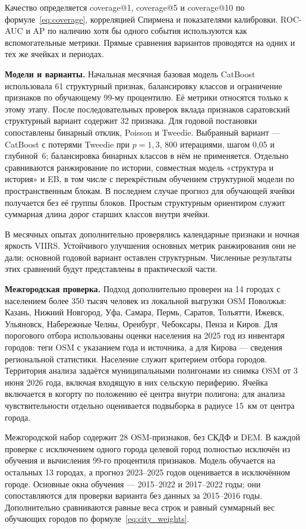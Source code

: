 \documentclass[coursework]{SCWorks}
\begin{document}
Качество определяется coverage@1, coverage@5 и coverage@10
по формуле~\eqref{eq:coverage}, корреляцией Спирмена и показателями
калибровки. ROC-AUC и AP по наличию хотя бы одного события
используются как вспомогательные метрики. Прямые сравнения вариантов
проводятся на одних и тех же ячейках и периодах.

\textbf{Модели и варианты.} Начальная месячная базовая модель
CatBoost использовала 61 структурный признак, балансировку классов
и ограничение признаков по обучающему 99-му процентилю. Её метрики
относятся только к этому этапу. После последовательных проверок
вклада признаков саратовский структурный вариант содержит 32 признака.
Для годовой постановки сопоставлены бинарный отклик, Poisson и
Tweedie. Выбранный вариант --- CatBoost с потерями Tweedie при
$p=1{,}3$, 800 итерациями, шагом 0{,}05 и глубиной~6;
балансировка бинарных классов в нём не применяется.
Отдельно сравниваются ранжирование по истории, совместная модель
«структура и история» и EB, в том числе с перекрёстным обучением
структурной модели по пространственным блокам. В последнем случае
прогноз для обучающей ячейки получается без её группы блоков.
Простым структурным ориентиром служит суммарная длина дорог старших
классов внутри ячейки.

В месячных опытах дополнительно проверялись календарные признаки
и ночная яркость VIIRS. Устойчивого улучшения основных метрик
ранжирования они не дали; основной годовой вариант оставлен структурным.
Численные результаты этих сравнений будут представлены
в практической части.

\textbf{Межгородская проверка.} Подход дополнительно
проверен на 14 городах с населением более 350 тысяч человек из
локальной выгрузки OSM Поволжья: Казань, Нижний Новгород, Уфа,
Самара, Пермь, Саратов, Тольятти, Ижевск, Ульяновск, Набережные
Челны, Оренбург, Чебоксары, Пенза и Киров. Для порогового отбора
использованы оценки населения на 2025 год из инвентаря городов:
теги OSM с указанием года и источника, а для Кирова --- сведения
региональной статистики. Население служит критерием отбора городов.
Территория анализа задаётся муниципальными полигонами из снимка OSM
от 3 июня 2026 года, включая входящую в них сельскую периферию.
Ячейка включается в когорту по
положению её центра внутри полигона; для анализа чувствительности
отдельно оценивается подвыборка в радиусе 15~км от центра города.

Межгородской набор содержит 28 OSM-признаков, без СКДФ и DEM. В каждой проверке с исключением одного города
целевой город полностью исключён из обучения и вычисления 99-го
процентиля признаков. Модель обучается на остальных
13 городах, а прогноз 2023--2025 годов оценивается в исключённом
городе. Основные окна обучения --- 2015--2022 и 2017--2022 годы;
они сопоставляются для проверки варианта без данных за 2015--2016 годы.
Дополнительно
сравниваются равные веса строк и равный суммарный вес обучающих
городов по формуле~\eqref{eq:city_weights}.
\end{document}
